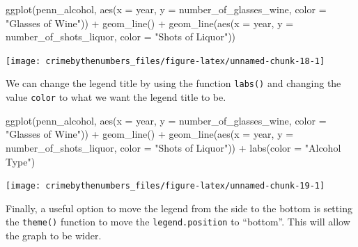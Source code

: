 \documentclass[
]{krantz}
\makeatletter
\newenvironment{Shaded}{\begin{snugshade}}{\end{snugshade}}
\newcommand{\AttributeTok}[1]{\textcolor[rgb]{0.61,0.61,0.61}{#1}}
\newcommand{\FunctionTok}[1]{\textcolor[rgb]{0,0,0}{#1}}
\newcommand{\NormalTok}[1]{#1}
\newcommand{\SpecialCharTok}[1]{\textcolor[rgb]{0,0,0}{#1}}
\newcommand{\StringTok}[1]{\textcolor[rgb]{0.5,0.5,0.5}{#1}}
\newenvironment{kframe}{%
\medskip{}
\setlength{\fboxsep}{.8em}
 \def\at@end@of@kframe{}%
 \ifinner\ifhmode%
  \def\at@end@of@kframe{\end{minipage}}%
  \begin{minipage}{\columnwidth}%
 \fi\fi%
 \def\FrameCommand##1{\hskip\@totalleftmargin \hskip-\fboxsep
 \colorbox{shadecolor}{##1}\hskip-\fboxsep
     \hskip-\linewidth \hskip-\@totalleftmargin \hskip\columnwidth}%
 \MakeFramed {\advance\hsize-\width
   \@totalleftmargin\z@ \linewidth\hsize
   \@setminipage}}%
 {\par\unskip\endMakeFramed%
 \at@end@of@kframe}
\renewenvironment{Shaded}{\begin{kframe}}{\end{kframe}}
\makeatother
\begin{document}
\begin{Shaded}
\begin{Highlighting}[]
\FunctionTok{ggplot}\NormalTok{(penn\_alcohol, }\FunctionTok{aes}\NormalTok{(}\AttributeTok{x =}\NormalTok{ year, }\AttributeTok{y =}\NormalTok{ number\_of\_glasses\_wine,}
                         \AttributeTok{color =} \StringTok{"Glasses of Wine"}\NormalTok{)) }\SpecialCharTok{+}
  \FunctionTok{geom\_line}\NormalTok{() }\SpecialCharTok{+}
  \FunctionTok{geom\_line}\NormalTok{(}\FunctionTok{aes}\NormalTok{(}\AttributeTok{x =}\NormalTok{ year, }\AttributeTok{y =}\NormalTok{ number\_of\_shots\_liquor,}
                \AttributeTok{color =} \StringTok{"Shots of Liquor"}\NormalTok{))}
\end{Highlighting}
\end{Shaded}

\begin{center}\texttt{[image: crimebythenumbers\_files/figure-latex/unnamed-chunk-18-1]} \end{center}

We can change the legend title by using the function \texttt{labs()} and changing the value \texttt{color} to what we want the legend title to be.

\begin{Shaded}
\begin{Highlighting}[]
\FunctionTok{ggplot}\NormalTok{(penn\_alcohol, }\FunctionTok{aes}\NormalTok{(}\AttributeTok{x =}\NormalTok{ year, }\AttributeTok{y =}\NormalTok{ number\_of\_glasses\_wine,}
                         \AttributeTok{color =} \StringTok{"Glasses of Wine"}\NormalTok{)) }\SpecialCharTok{+}
  \FunctionTok{geom\_line}\NormalTok{() }\SpecialCharTok{+}
  \FunctionTok{geom\_line}\NormalTok{(}\FunctionTok{aes}\NormalTok{(}\AttributeTok{x =}\NormalTok{ year, }\AttributeTok{y =}\NormalTok{ number\_of\_shots\_liquor,}
                \AttributeTok{color =} \StringTok{"Shots of Liquor"}\NormalTok{)) }\SpecialCharTok{+}
  \FunctionTok{labs}\NormalTok{(}\AttributeTok{color =} \StringTok{"Alcohol Type"}\NormalTok{)}
\end{Highlighting}
\end{Shaded}

\begin{center}\texttt{[image: crimebythenumbers\_files/figure-latex/unnamed-chunk-19-1]} \end{center}

Finally, a useful option to move the legend from the side to the bottom is setting the \texttt{theme()} function to move the \texttt{legend.position} to ``bottom''. This will allow the graph to be wider.
\end{document}
